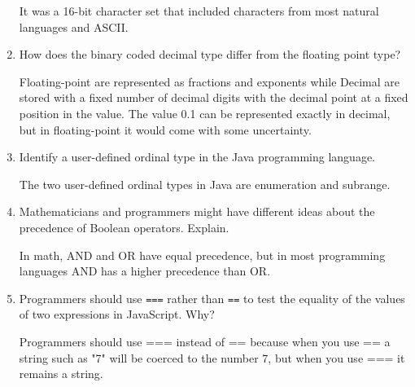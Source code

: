 \begin{enumerate}
  \begin{answer}

    It was a 16-bit character set that included characters from most natural languages and ASCII.

    \end{answer}

  \item How does the binary coded decimal type differ from the
    floating point type?

  \begin{answer}

    Floating-point are represented as fractions and exponents while Decimal are stored with a fixed number of decimal digits with the decimal point at a fixed position in the value.  The value 0.1 can be represented exactly in decimal, but in floating-point it would come with some uncertainty.

    \end{answer}

  \item Identify a user-defined ordinal type in the Java programming
    language.

  \begin{answer}

    The two user-defined ordinal types in Java are enumeration and subrange.

    \end{answer}

  \item Mathematicians and programmers might have different ideas
    about the precedence of Boolean operators. Explain.

  \begin{answer}

    In math, AND and OR have equal precedence, but in most programming languages AND has a higher precedence than OR.

    \end{answer}

  \item Programmers should use \verb+===+ rather than \verb+==+ to
    test the equality of the values of two expressions in JavaScript. Why?

  \begin{answer}

    Programmers should use === instead of == because when you use == a string such as "7" will be coerced to the number 7, but when you use === it remains a string.

    \end{answer}


\end{enumerate}
